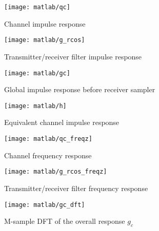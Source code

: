\documentclass[a4paper,oneside]{article}
\begin{document}
\begin{figure}[htbp]
  \centering
  \texttt{[image: matlab/qc]}
  \caption{Channel impulse response}
  \label{plot:qc}
\end{figure}

\begin{figure}[htbp]
  \centering
  \texttt{[image: matlab/g\_rcos]}
  \caption{Transmitter/receiver filter impulse response}
  \label{plot:g_rcos}
\end{figure}

\begin{figure}[htbp]
  \centering
  \texttt{[image: matlab/gc]}
  \caption{Global impulse response before receiver sampler}
  \label{plot:gc}
\end{figure}

\begin{figure}[htbp]
  \centering
  \texttt{[image: matlab/h]}
  \caption{Equivalent channel impulse response}
  \label{plot:h}
\end{figure}


\begin{figure}[htbp]
  \centering
  \texttt{[image: matlab/qc\_freqz]}
  \caption{Channel frequency response}
  \label{plot:qc_freqz}
\end{figure}

\begin{figure}[htbp]
  \centering
  \texttt{[image: matlab/g\_rcos\_freqz]}
  \caption{Transmitter/receiver filter frequency response}
  \label{plot:g_rcos_freqz}
\end{figure}

\begin{figure}[htbp]
  \centering
  \texttt{[image: matlab/gc\_dft]}
  \caption{M-sample DFT of the overall response $g_c$}
  \label{plot:gc_dft}
\end{figure}
\end{document}
